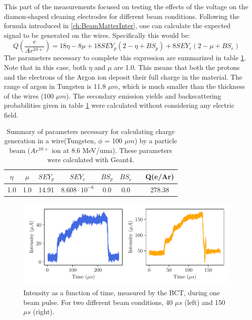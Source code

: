 This part of the measurements focused on testing the effects of the voltage on the diamon-shaped cleaning electrodes for different beam conditions. Following the formula introduced in \ref{ch:BeamMatterInter}, one can calculate the expected signal to be generated on the wires. Specifically this would be:
\begin{equation}
    Q\left(\frac{e}{Ar^{10+}}\right) = 18\eta - 8 \mu + 18SEY_{p}\left( 2 - \eta + BS_{p}\right) + 8SEY_{e}\left(2 - \mu + BS_{e}\right)
\end{equation}
The parameters necessary to complete this expression are summarized in table \ref{tab:CurrentParAr10}. Note that in this case, both $\eta$ and $\mu$ are 1.0. This means that both the protons and the electrons of the Argon ion deposit their full charge in the material. The range of argon in Tungsten is 11.8 $\mu m$, which is much smaller than the thickness of the wires (100 $\mu m$). The secondary emission yields and backscattering probabilities given in table \ref{tab:CurrentParAr10} were calculated without considering any electric field. 
\begin{table}[h]
    \centering
    \begin{tabular}{cccccccc}
    \hline
    $\eta$ & $\mu$ & $SEY_p$ & $SEY_e$ & $BS_p$ & $BS_e$ & & Q(e/Ar) \\ \hline
      1.0  &  1.0  &  14.91    &  $8.608\cdot 10^{-6}$   & 0.0    &  0.0 & & 278.38  \\ \hline
    \end{tabular}
    \caption{Summary of parameters necessary for calculating charge generation in a wire(Tungsten, $\phi $ = 100 $\mu m$) by a particle beam ($Ar^{10+}$ ion at 8.6 MeV/uma). These parameters were calculated with Geant4.}
    \label{tab:CurrentParAr10}
\end{table}

\begin{figure}[h]
    \vspace{-0.4cm}
    \centering
    \includegraphics[width=0.95\columnwidth]{BCTSignalExample/BCTSignalExamples.pdf}
    \caption{Intensity as a function of time, measured by the BCT, during one beam pulse. For two different beam conditions, 40 $\mu s$ (left) and 150 $\mu s$ (right).}
    \label{fig:BCTExample}
\end{figure}

